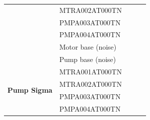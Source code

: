 \begin{table}[ht]
\begin{tabular}{|l|l|p{0.6cm}|p{0.6cm}|p{0.6cm}|p{0.6cm}|p{0.6cm}|p{0.6cm}|}
                                                                                      & MTRA002AT000TN                          & \multicolumn{2}{p{1.2cm}|}{}                 & \multicolumn{2}{p{1.2cm}|}{}                 & \multicolumn{2}{p{1.2cm}|}{}                 \\ \cline{2-8} 
                                                                                      & PMPA003AT000TN                          & \multicolumn{2}{p{1.2cm}|}{}                 & \multicolumn{2}{p{1.2cm}|}{}                 & \multicolumn{2}{p{1.2cm}|}{}                 \\ \cline{2-8} 
                                                                                      & PMPA004AT000TN                          & \multicolumn{2}{p{1.2cm}|}{}                 & \multicolumn{2}{p{1.2cm}|}{}                 & \multicolumn{2}{p{1.2cm}|}{}                 \\ \cline{2-8} 
                                                                                      & Motor base (noise)                      & \multicolumn{2}{p{1.2cm}|}{}                 & \multicolumn{2}{p{1.2cm}|}{}                 & \multicolumn{2}{p{1.2cm}|}{}                 \\ \cline{2-8} 
                                                                                      & Pump base (noise)                       & \multicolumn{2}{p{1.2cm}|}{}                 & \multicolumn{2}{p{1.2cm}|}{}                 & \multicolumn{2}{p{1.2cm}|}{}                 \\ \hline
\multirow{6}{*}{\textbf{Pump Sigma}}                                                  & MTRA001AT000TN                          & \multicolumn{2}{p{1.2cm}|}{}                 & \multicolumn{2}{p{1.2cm}|}{}                 & \multicolumn{2}{p{1.2cm}|}{}                 \\ \cline{2-8} 
                                                                                      & MTRA002AT000TN                          & \multicolumn{2}{p{1.2cm}|}{}                 & \multicolumn{2}{p{1.2cm}|}{}                 & \multicolumn{2}{p{1.2cm}|}{}                 \\ \cline{2-8} 
                                                                                      & PMPA003AT000TN                          & \multicolumn{2}{p{1.2cm}|}{}                 & \multicolumn{2}{p{1.2cm}|}{}                 & \multicolumn{2}{p{1.2cm}|}{}                 \\ \cline{2-8} 
                                                                                      & PMPA004AT000TN                          & \multicolumn{2}{p{1.2cm}|}{}                 & \multicolumn{2}{p{1.2cm}|}{}                 & \multicolumn{2}{p{1.2cm}|}{}                 \\ \cline{2-8} 

\end{tabular}
\end{table}
